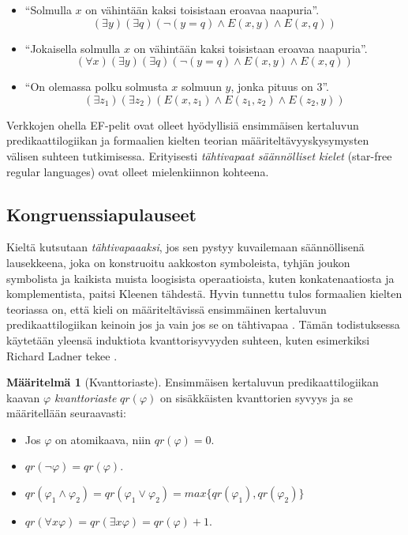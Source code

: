 \documentclass[finnish]{tktltiki2}
\theoremstyle{definition}
\newtheorem{maar}[lau]{Määritelmä}
\theoremstyle{remark}
\begin{document}
\begin{itemize}
\item ``Solmulla $x$ on vähintään kaksi toisistaan eroavaa naapuria''. \[(\exists y)(\exists q)(\neg(y = q) \land E(x, y) \land E(x, q))\]
\item ``Jokaisella solmulla $x$ on vähintään kaksi toisistaan eroavaa naapuria''. \[(\forall x)(\exists y)(\exists q)(\neg(y = q)\land E(x, y) \land E(x, q))\]
\item ``On olemassa polku solmusta $x$ solmuun $y$, jonka pituus on $3$''. \[(\exists z_1)(\exists z_2)(E(x, z_1)\land E(z_1, z_2) \land E(z_2, y))\]
\end{itemize}

Verkkojen ohella EF-pelit ovat olleet hyödyllisiä ensimmäisen kertaluvun predikaattilogiikan ja formaalien kielten teorian määriteltävyyskysymysten välisen suhteen tutkimisessa. Erityisesti \textit{tähtivapaat säännölliset kielet} (star-free regular languages) ovat olleet mielenkiinnon kohteena.

\subsection{Kongruenssiapulauseet}
Kieltä kutsutaan \textit{tähtivapaaaksi}, jos sen pystyy kuvailemaan säännöllisenä lausekkeena, joka on konstruoitu aakkoston symboleista, tyhjän joukon symbolista ja kaikista muista loogisista operaatioista, kuten konkatenaatiosta ja komplementista, paitsi Kleenen tähdestä. Hyvin tunnettu tulos formaalien kielten teoriassa on, että kieli on määriteltävissä ensimmäinen kertaluvun predikaattilogiikan keinoin jos ja vain jos se on tähtivapaa \cite{McN71}. Tämän todistuksessa käytetään yleensä induktiota kvanttorisyvyyden suhteen, kuten esimerkiksi Richard Ladner tekee \cite{Lad77}.

\begin{maar}[Kvanttoriaste]
Ensimmäisen kertaluvun predikaattilogiikan kaavan $\varphi$ \textit{kvanttoriaste} $qr(\varphi)$ on sisäkkäisten kvanttorien syvyys ja se määritellään seuraavasti:
\begin{itemize}
\item Jos $\varphi$ on atomikaava, niin $qr(\varphi) = 0$.
\item $qr(\neg \varphi) = qr(\varphi)$.
\item $qr(\varphi_1 \land \varphi_2) = qr(\varphi_1 \lor \varphi_2) = max\{qr(\varphi_1), qr(\varphi_2)\}$
\item $qr(\forall x \varphi) = qr(\exists x \varphi) = qr(\varphi) + 1$.
\end{itemize}
\end{maar}
\end{document}
